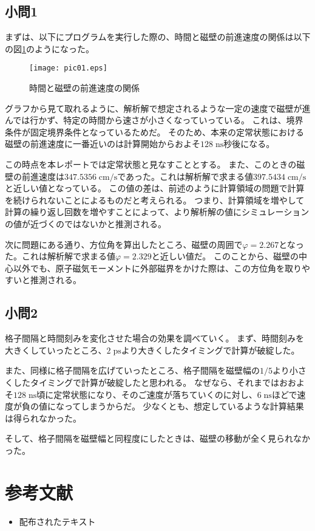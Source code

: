 \documentclass{jsarticle}
\begin{document}
\subsection{小問1}
まずは、以下にプログラムを実行した際の、時間と磁壁の前進速度の関係は以下の図\ref{fig01}のようになった。
\begin{figure}[H]
	\centering
	\texttt{[image: pic01.eps]}
	\caption{時間と磁壁の前進速度の関係}
	\label{fig01}
\end{figure}

グラフから見て取れるように、解析解で想定されるような一定の速度で磁壁が進んでは行かず、特定の時間から速さが小さくなっていっている。
これは、境界条件が固定境界条件となっているためだ。
そのため、本来の定常状態における磁壁の前進速度に一番近いのは計算開始からおよそ$128\;\mathrm{ns}$秒後になる。

この時点を本レポートでは定常状態と見なすこととする。
また、このときの磁壁の前進速度は$347.5356\;\mathrm{cm/s}$であった。これは解析解で求まる値$397.5434\;\mathrm{cm/s}$と近しい値となっている。
この値の差は、前述のように計算領域の問題で計算を続けられないことによるものだと考えられる。
つまり、計算領域を増やして計算の繰り返し回数を増やすことによって、より解析解の値にシミュレーションの値が近づくのではないかと推測される。

次に問題にある通り、方位角を算出したところ、磁壁の周囲で$\varphi = 2.267$となった。これは解析解で求まる値$\varphi = 2.329$と近しい値だ。
このことから、磁壁の中心以外でも、原子磁気モーメントに外部磁界をかけた際は、この方位角を取りやすいと推測される。

\subsection{小問2}
格子間隔と時間刻みを変化させた場合の効果を調べていく。
まず、時間刻みを大きくしていったところ、$2\;\mathrm{ps}$より大きくしたタイミングで計算が破綻した。

また、同様に格子間隔を広げていったところ、格子間隔を磁壁幅の$1/5$より小さくしたタイミングで計算が破綻したと思われる。
なぜなら、それまではおおよそ$128\;\mathrm{ns}$頃に定常状態になり、そのご速度が落ちていくのに対し、$6\;\mathrm{ns}$ほどで速度が負の値になってしまうからだ。
少なくとも、想定しているような計算結果は得られなかった。

そして、格子間隔を磁壁幅と同程度にしたときは、磁壁の移動が全く見られなかった。

\section{参考文献}

\begin{itemize}
  \item 配布されたテキスト
\end{itemize}
\end{document}
